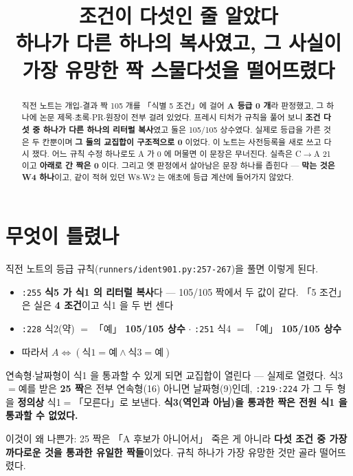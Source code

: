 \documentclass{article}
\title{조건이 다섯인 줄 알았다 \\
  {\large 하나가 다른 하나의 복사였고, 그 사실이 가장 유망한 짝 스물다섯을 떨어뜨렸다}}
\begin{document}
\maketitle

\begin{abstract}
직전 노트는 개입-결과 짝 105 개를 「식별 5 조건」에 걸어 \textbf{A 등급 0 개}라 판정했고,
그 하나에 논문 제목$\cdot$초록$\cdot$PR$\cdot$원장이 전부 걸려 있었다.
프레시 티처가 규칙을 풀어 보니 \textbf{조건 다섯 중 하나가 다른 하나의 리터럴 복사}였고
둘은 105/105 상수였다. 실제로 등급을 가른 것은 두 칸뿐이며 \textbf{그 둘의 교집합이 구조적으로 0} 이었다.
이 노트는 사전등록을 새로 쓰고 다시 쟀다.
{어느 규칙 수정 하나로도 A 가 0 에 머물면 이 문장은 무너진다.
실측은 C$\to$A 21 이고 \textbf{아래로 간 짝은 0} 이다.}
그리고 옛 판정에서 살아남은 문장 하나를 좁힌다 --- \textbf{막는 것은 W4 하나}이고,
같이 적혀 있던 W8$\cdot$W2 는 애초에 등급 계산에 들어가지 않았다.
\end{abstract}

\section{무엇이 틀렸나}

직전 노트의 등급 규칙(\texttt{runners/ident901.py:257-267})을 풀면 이렇게 된다.

\begin{itemize}
\item \texttt{:255} \textbf{식5 가 식1 의 리터럴 복사}다 --- 105/105 짝에서 두 값이 같다.
      「5 조건」은 실은 \textbf{4 조건}이고 식1 을 두 번 센다
\item \texttt{:228} 식2(약) $=$ 「예」 \textbf{105/105 상수} $\cdot$ \texttt{:251} 식4 $=$ 「예」 \textbf{105/105 상수}
\item 따라서 $A \iff (\text{식1}=\text{예} \wedge \text{식3}=\text{예})$
\end{itemize}

{연속형$\cdot$날짜형이 식1 을 통과할 수 있게 되면 교집합이 열린다 --- 실제로 열렸다.}
식3$=$예를 받은 \textbf{25 짝}은 전부 연속형(16) 아니면 날짜형(9)인데,
\texttt{:219}$\cdot$\texttt{:224} 가 그 두 형을 \textbf{정의상} 식1$=$「모른다」로 보낸다.
\textbf{식3(역인과 아님)을 통과한 짝은 전원 식1 을 통과할 수 없었다.}

이것이 왜 나쁜가: 25 짝은 「A 후보가 아니어서」 죽은 게 아니라
\textbf{다섯 조건 중 가장 까다로운 것을 통과한 유일한 짝들}이었다.
규칙 하나가 가장 유망한 것만 골라 떨어뜨렸다.
\end{document}
